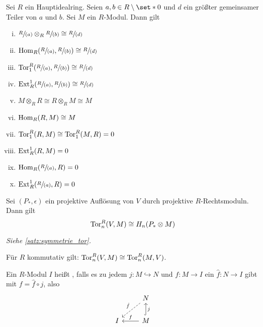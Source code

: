\begin{bemerkung}[{name=[{Formeln für den Fall eines Hauptidealringes}]}]
	Sei $R$ ein Hauptidealring. 
	Seien $a,b \in R\setminus \set*{0}$ und $d$ ein größter gemeinsamer Teiler von $a$ und $b$.
	Sei $M$ ein $R$-Modul.
	Dann gilt
	\begin{multicols}{2}
		\begin{enumerate}[(i)]
			\item $\sfrac{R}{(a)} \otimes_R \sfrac{R}{(b)} \cong \sfrac{R}{(d)}$
			\item $\Hom_R \enbrace*{\sfrac{R}{(a)},\sfrac{R}{(b)}} \cong \sfrac{R}{(d)}$
			\item $\Tor_1^R \enbrace*{\sfrac{R}{(a)}, \sfrac{R}{(b)}} \cong \sfrac{R}{(d)}$
			\item $\Ext^1_R \enbrace*{\sfrac{R}{(a)}, \sfrac{R}{(b)}} \cong \sfrac{R}{(d)}$
			\item $M \otimes_R R \cong R \otimes_R M \cong M$
			\item $\operatorname{Hom}_R(R,M) \cong M$
			\item $\operatorname{Tor}^R_1(R,M) \cong \operatorname{Tor}_1^R(M,R)=0$
			\item $\operatorname{Ext}^1_R(R,M) =0$
			\item $\Hom_R \enbrace*{\sfrac{R}{(a)},R}=0$
			\item $\Ext_R^1 \enbrace*{\sfrac{R}{(a)},R}=0$
		\end{enumerate}
	\end{multicols}
\end{bemerkung}

\begin{bemerkung}[{name=[{Tor: Auflösung für den \enquote{an-tensorierten} Modul}]}]
	Sei $(P_*,\epsilon)$ ein projektive Auflösung von $V$ durch projektive $R$-Rechtsmoduln.
	Dann gilt 
	\[
		\operatorname{Tor}_n^R(V,M) \cong H_n(P_* \otimes M)
	\]
\end{bemerkung}
\begin{beweis}
	\emph{Siehe \autoref{satz:symmetrie_tor}.}
\end{beweis}

\begin{korollarB}[{name=[{Reihenfolge der Argumente von Tor}]}]
	Für $R$ kommutativ gilt: $\operatorname{Tor}_n^R(V,M) \cong \operatorname{Tor}_n^R(M,V)$.
\end{korollarB}

\begin{definition}[{name=[injektiver Modul]}]
	Ein $R$-Modul $I$ heißt , falls es zu jedem $j \colon M \hookrightarrow N$ und $f \colon M \to I$ ein $\hat{f} \colon N \to I$ gibt mit $f = \hat{f} \circ j$, also
	\[
		\begin{tikzcd}
			\mbox{ } & N \dlar[dashed,"\hat{f}"'] \\
			I & M \lar["f"'] \uar["j"',hook]
		\end{tikzcd}
	\]
\end{definition}

